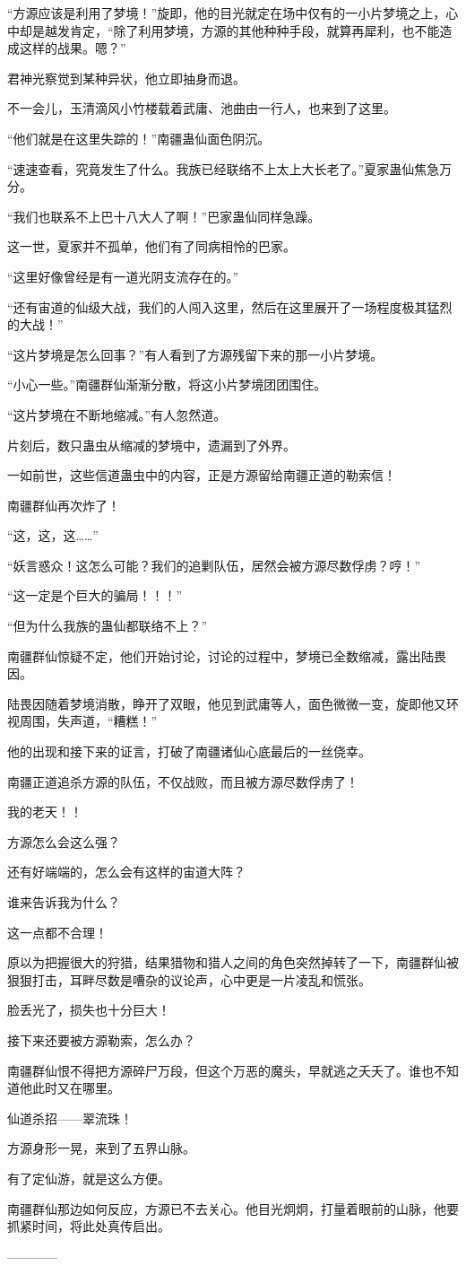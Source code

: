 \begin{this_body}
“方源应该是利用了梦境！”旋即，他的目光就定在场中仅有的一小片梦境之上，心中却是越发肯定，“除了利用梦境，方源的其他种种手段，就算再犀利，也不能造成这样的战果。嗯？”

君神光察觉到某种异状，他立即抽身而退。

不一会儿，玉清滴风小竹楼载着武庸、池曲由一行人，也来到了这里。

“他们就是在这里失踪的！”南疆蛊仙面色阴沉。

“速速查看，究竟发生了什么。我族已经联络不上太上大长老了。”夏家蛊仙焦急万分。

“我们也联系不上巴十八大人了啊！”巴家蛊仙同样急躁。

这一世，夏家并不孤单，他们有了同病相怜的巴家。

“这里好像曾经是有一道光阴支流存在的。”

“还有宙道的仙级大战，我们的人闯入这里，然后在这里展开了一场程度极其猛烈的大战！”

“这片梦境是怎么回事？”有人看到了方源残留下来的那一小片梦境。

“小心一些。”南疆群仙渐渐分散，将这小片梦境团团围住。

“这片梦境在不断地缩减。”有人忽然道。

片刻后，数只蛊虫从缩减的梦境中，遗漏到了外界。

一如前世，这些信道蛊虫中的内容，正是方源留给南疆正道的勒索信！

南疆群仙再次炸了！

“这，这，这……”

“妖言惑众！这怎么可能？我们的追剿队伍，居然会被方源尽数俘虏？哼！”

“这一定是个巨大的骗局！！！”

“但为什么我族的蛊仙都联络不上？”

南疆群仙惊疑不定，他们开始讨论，讨论的过程中，梦境已全数缩减，露出陆畏因。

陆畏因随着梦境消散，睁开了双眼，他见到武庸等人，面色微微一变，旋即他又环视周围，失声道，“糟糕！”

他的出现和接下来的证言，打破了南疆诸仙心底最后的一丝侥幸。

南疆正道追杀方源的队伍，不仅战败，而且被方源尽数俘虏了！

我的老天！！

方源怎么会这么强？

还有好端端的，怎么会有这样的宙道大阵？

谁来告诉我为什么？

这一点都不合理！

原以为把握很大的狩猎，结果猎物和猎人之间的角色突然掉转了一下，南疆群仙被狠狠打击，耳畔尽数是嘈杂的议论声，心中更是一片凌乱和慌张。

脸丢光了，损失也十分巨大！

接下来还要被方源勒索，怎么办？

南疆群仙恨不得把方源碎尸万段，但这个万恶的魔头，早就逃之夭夭了。谁也不知道他此时又在哪里。

仙道杀招——翠流珠！

方源身形一晃，来到了五界山脉。

有了定仙游，就是这么方便。

南疆群仙那边如何反应，方源已不去关心。他目光炯炯，打量着眼前的山脉，他要抓紧时间，将此处真传启出。

------------

\end{this_body}

